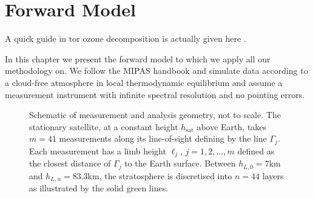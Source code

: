 \chapter{Forward Model}
\label{ch:formodel}
A quick guide in tor ozone decomposition is actually given here \cite{Lee2020NightOzone}.

In this chapter we present the forward model to which we apply all our methodology on. We follow the MIPAS handbook \cite{mipas2000handbook} and simulate data according to a cloud-free atmosphere in local thermodynamic equilibrium and assume a measurement instrument with infinite spectral resolution and no pointing errors.
\begin{figure}[ht!]
	\centering
	
	\caption[Schematic of measurement and analysis geometry.]{Schematic of measurement and analysis geometry, not to scale.
		The stationary satellite, at a constant height $h_\text{sat}$ above Earth, takes $m = 41$ measurements along its line-of-sight defining by the line $\Gamma_j$.
		Each measurement has a limb height $\ell_j$, $j=1,2,\dots,m$ defined as the closest distance of $\Gamma_j$ to the Earth surface.
		Between $h_{L,0} = 7$km and $h_{L,n} = 83.3$km, the stratosphere is discretised into $n =44$ layers as illustrated by the solid green lines.}
	\label{fig:LIMB}
\end{figure}


